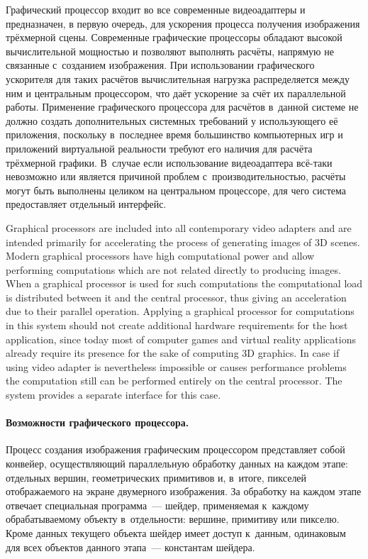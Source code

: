 \documentclass[a4paper, 12pt, titlepage]{extarticle}
\begin{document}
\begin{original}
        Графический процессор входит во все современные видеоадаптеры и предназначен, в
        первую очередь, для ускорения процесса получения изображения трёхмерной сцены. Современные
        графические процессоры обладают высокой вычислительной мощностью и позволяют выполнять
        расчёты, напрямую не связанные с~созданием изображения. При использовании графического
        ускорителя для таких расчётов вычислительная нагрузка распределяется между ним и центральным
        процессором, что даёт ускорение за счёт их параллельной работы. Применение графического
        процессора для расчётов в~данной системе не должно создать дополнительных системных
        требований у использующего её приложения, поскольку в~последнее время большинство компьютерных игр и
        приложений виртуальной реальности требуют его наличия для расчёта трёхмерной графики. В~случае если
        использование видеоадаптера всё-таки невозможно или является причиной проблем
        с~производительностью, расчёты могут быть выполнены целиком на центральном процессоре, для
        чего система предоставляет отдельный интерфейс.
\end{original}

        Graphical processors are included into all contemporary video adapters and are intended
        primarily for accelerating the process of generating images of 3D scenes. Modern graphical
        processors have high computational power and allow performing computations which are not
        related directly to producing images. When a graphical processor is used for such
        computations the computational load is distributed between it and the central processor,
        thus giving an acceleration due to their parallel operation. Applying a graphical processor
        for computations in this system should not create additional hardware requirements for the
        host application, since today most of computer games and virtual reality applications
        already require its presence for the sake of computing 3D graphics. In case if using video
        adapter is nevertheless impossible or causes performance problems the computation still can
        be performed entirely on the central processor. The system provides a separate interface for
        this case.

\begin{original}
        \paragraph{Возможности графического процессора.}
        Процесс создания изображения графическим процессором представляет собой конвейер,
        осуществляющий параллельную обработку данных на каждом этапе: отдельных вершин,
        геометрических примитивов и, в~итоге, пикселей отображаемого на экране двумерного
        изображения. За обработку на каждом этапе отвечает специальная программа~--- шейдер,
        применяемая к~каждому обрабатываемому объекту в~отдельности: вершине, примитиву или пикселю.
        Кроме данных текущего объекта шейдер имеет доступ к~данным, одинаковым для всех объектов
        данного этапа~--- константам шейдера.
\end{original}
\end{document}
